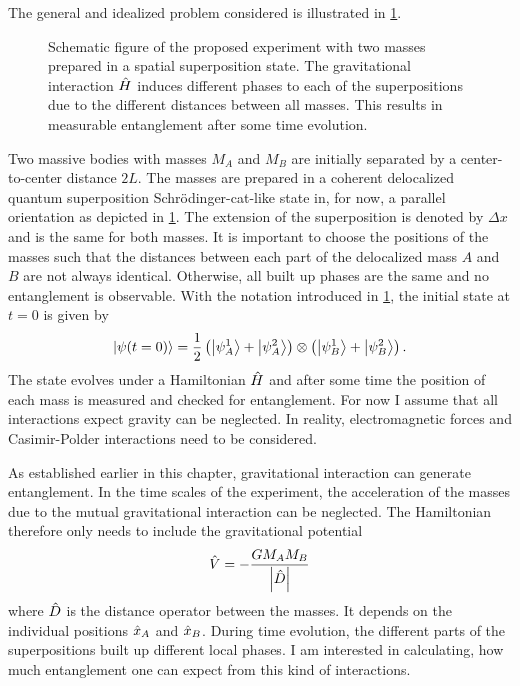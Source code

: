 The general and idealized problem considered is illustrated in \cref{fig:2:simple-problem}.
\begin{figure}[!htbp]
  \centering
  \def\svgwidth{\textwidth}
  
  \caption{Schematic figure of the proposed experiment with two masses prepared in a spatial superposition state. The gravitational interaction $\hat{H}$ induces different phases to each of the superpositions due to the different distances between all masses. This results in measurable entanglement after some time evolution.}
  \label{fig:2:simple-problem}
\end{figure}
Two massive bodies with masses $M_A$ and $M_B$ are initially separated by a center-to-center distance $2L$. The masses are prepared in a coherent delocalized quantum superposition Schrödinger-cat-like state in, for now, a parallel orientation as depicted in \cref{fig:2:simple-problem}.
The extension of the superposition is denoted by $\Delta x$ and is the same for both masses.
It is important to choose the positions of the masses such that the distances between each part of the delocalized mass $A$ and $B$ are not always identical. 
Otherwise, all built up phases are the same and no entanglement is observable.
With the notation introduced in \cref{fig:2:simple-problem}, the initial state at $t=0$ is given by
\begin{equation}\label{eq:2:initial-state}
  \ket{\psi(t=0)} = \frac{1}{2}\left( \ket{\psi_A^1} + \ket{\psi_A^2} \right) \otimes \left( \ket{\psi_B^1} + \ket{\psi_B^2} \right) .
\end{equation}
The state evolves under a Hamiltonian $\hat{H}$ and after some time the position of each mass is measured and checked for entanglement.
For now I assume that all interactions expect gravity can be neglected. In reality, electromagnetic forces and Casimir-Polder interactions \cite{Casimir_1948, Casimir_1948a} need to be considered.

As established earlier in this chapter, gravitational interaction can generate entanglement. In the time scales of the experiment, the acceleration of the masses due to the mutual gravitational interaction can be neglected. The Hamiltonian therefore only needs to include the gravitational potential 
\begin{equation} \label{eq:2:potential}
  \hat{V} = -\frac{GM_AM_B}{\left\lvert\hat{D}\right\rvert}
\end{equation}
where $\hat{D}$ is the distance operator between the masses. It depends on the individual positions $\hat{x}_A$ and $\hat{x}_B$.
During time evolution, the different parts of the superpositions built up different local phases. I am interested in calculating, how much entanglement one can expect from this kind of interactions.


